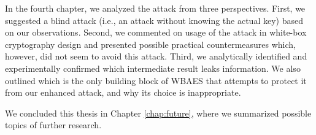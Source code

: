 In the fourth chapter, we analyzed the attack from three perspectives. First, we suggested a blind attack (i.e., an attack without knowing the actual key) based on our observations. Second, we commented on usage of the attack in white-box cryptography design and presented possible practical countermeasures which, however, did not seem to avoid this attack. Third, we analytically identified and experimentally confirmed which intermediate result leaks information. We also outlined which is the only building block of WBAES that attempts to protect it from our enhanced attack, and why its choice is inappropriate.

We concluded this thesis in Chapter \ref{chap:future}, where we summarized possible topics of further research.
